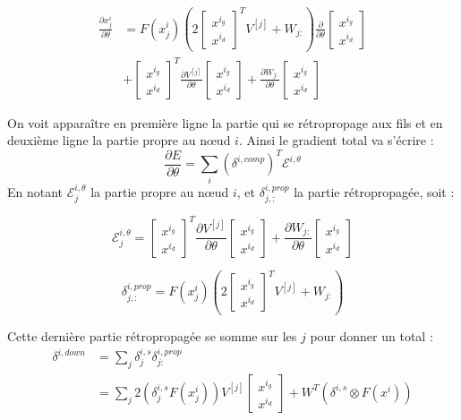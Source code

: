 \documentclass[conference]{IEEEtran}
\begin{document}
\begin{align*}
\frac{\partial x_j^i}{\partial \theta}&=F(x_j^i) \left( 2\begin{bmatrix} x^{i_g} \\ x^{i_d} \end{bmatrix}^T V^{[j]} +W_{j:}\right)\frac{\partial}{\partial\theta}\begin{bmatrix} x^{i_g} \\ x^{i_d} \end{bmatrix}\\
&+ \begin{bmatrix} x^{i_g} \\ x^{i_d} \end{bmatrix}^T \frac{\partial V^{[j]}}{\partial\theta}\begin{bmatrix} x^{i_g} \\ x^{i_d} \end{bmatrix} + \frac{\partial W_{j:}}{\partial\theta}\begin{bmatrix} x^{i_g} \\ x^{i_d} \end{bmatrix}
\end{align*}

On voit apparaître en première ligne la partie qui se rétropropage aux fils et en deuxième ligne la partie propre au nœud $i$. Ainsi le gradient total va s'écrire :
$$\frac{\partial E}{\partial\theta}=\sum_{i}(\delta^{i,comp})^T \mathcal{E}^{i,\theta}$$
En notant $\mathcal{E}_j^{i,\theta}$ la partie propre au nœud $i$, et $\delta_{j,:}^{i,prop}$ la partie rétropropagée, soit :

$$\mathcal{E}_j^{i,\theta}=\begin{bmatrix} x^{i_g} \\ x^{i_d} \end{bmatrix}^T \frac{\partial V^{[j]}}{\partial\theta}\begin{bmatrix} x^{i_g} \\ x^{i_d} \end{bmatrix} + \frac{\partial W_{j:}}{\partial\theta}\begin{bmatrix} x^{i_g} \\ x^{i_d} \end{bmatrix}$$

$$\delta_{j,:}^{i,prop}=F(x_j^i) \left( 2\begin{bmatrix} x^{i_g} \\ x^{i_d} \end{bmatrix}^T V^{[j]} +W_{j:}\right)$$

Cette dernière partie rétropropagée se somme sur les $j$ pour donner un total :
\begin{align*}
\delta^{i,down}&=\sum_j \delta^{i,s}_j\delta^{i,prop}_{j:}\\
&=\sum_j 2(\delta_j^{i,s} F(x^i_j)) V^{[j]}\begin{bmatrix} x^{i_g} \\ x^{i_d} \end{bmatrix}+W^T(\delta^{i,s}\otimes F(x^i))
\end{align*}
\end{document}
